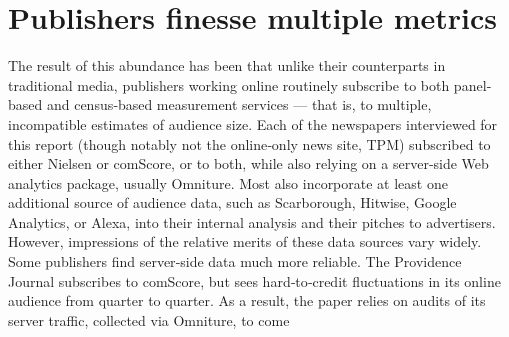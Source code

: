\section{Publishers finesse multiple metrics}
The result of this abundance has been that unlike their counterparts in
traditional media, publishers working online routinely subscribe to both
panel‐based and census‐based measurement services — that is, to
multiple, incompatible estimates of audience size. Each of the newspapers
interviewed for this report (though notably not the online‐only news site,
TPM) subscribed to either Nielsen or comScore, or to both, while also
relying on a server‐side Web analytics package, usually Omniture. Most
also incorporate at least one additional source of audience data, such as
Scarborough, Hitwise, Google Analytics, or Alexa, into their internal
analysis and their pitches to advertisers.
However, impressions of the relative merits of these data sources vary
widely. Some publishers find server‐side data much more reliable. The
Providence Journal subscribes to comScore, but sees hard‐to‐credit
fluctuations in its online audience from quarter to quarter. As a result, the
paper relies on audits of its server traffic, collected via Omniture, to come


